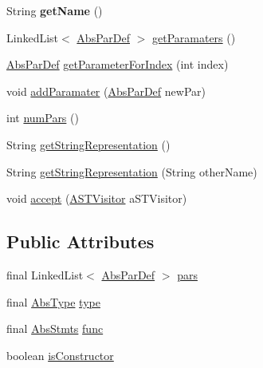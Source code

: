 \begin{DoxyCompactItemize}
String {\bfseries get\+Name} ()
\item 
Linked\+List$<$ \hyperlink{classcompiler_1_1abstr_1_1tree_1_1def_1_1_abs_par_def}{Abs\+Par\+Def} $>$ \hyperlink{classcompiler_1_1abstr_1_1tree_1_1def_1_1_abs_fun_def_adc15deedb95d9b1d1c583fb63755b910}{get\+Paramaters} ()
\item 
\hyperlink{classcompiler_1_1abstr_1_1tree_1_1def_1_1_abs_par_def}{Abs\+Par\+Def} \hyperlink{classcompiler_1_1abstr_1_1tree_1_1def_1_1_abs_fun_def_abace2842d9a93985deb64340fa29e622}{get\+Parameter\+For\+Index} (int index)
\item 
void \hyperlink{classcompiler_1_1abstr_1_1tree_1_1def_1_1_abs_fun_def_ac01d629c34d49611916d0571834c2e4e}{add\+Paramater} (\hyperlink{classcompiler_1_1abstr_1_1tree_1_1def_1_1_abs_par_def}{Abs\+Par\+Def} new\+Par)
\item 
int \hyperlink{classcompiler_1_1abstr_1_1tree_1_1def_1_1_abs_fun_def_aefa0345a1510770f1e25417c75fc0576}{num\+Pars} ()
\item 
String \hyperlink{classcompiler_1_1abstr_1_1tree_1_1def_1_1_abs_fun_def_a5554f085a80d0c03ab3279d102b3c279}{get\+String\+Representation} ()
\item 
String \hyperlink{classcompiler_1_1abstr_1_1tree_1_1def_1_1_abs_fun_def_a0a9ef5b553cacab89d24d00e010265ec}{get\+String\+Representation} (String other\+Name)
\item 
void \hyperlink{classcompiler_1_1abstr_1_1tree_1_1def_1_1_abs_fun_def_aa3fd15a24442f38f63267d1801360172}{accept} (\hyperlink{interfacecompiler_1_1abstr_1_1_a_s_t_visitor}{A\+S\+T\+Visitor} a\+S\+T\+Visitor)
\end{DoxyCompactItemize}
\subsection*{Public Attributes}
\begin{DoxyCompactItemize}
\item 
final Linked\+List$<$ \hyperlink{classcompiler_1_1abstr_1_1tree_1_1def_1_1_abs_par_def}{Abs\+Par\+Def} $>$ \hyperlink{classcompiler_1_1abstr_1_1tree_1_1def_1_1_abs_fun_def_affce067bbb05095f6f5d77a2e59a8cc0}{pars}
\item 
final \hyperlink{classcompiler_1_1abstr_1_1tree_1_1type_1_1_abs_type}{Abs\+Type} \hyperlink{classcompiler_1_1abstr_1_1tree_1_1def_1_1_abs_fun_def_ae1ea3ae300b56b151f64b298e738cf0a}{type}
\item 
final \hyperlink{classcompiler_1_1abstr_1_1tree_1_1_abs_stmts}{Abs\+Stmts} \hyperlink{classcompiler_1_1abstr_1_1tree_1_1def_1_1_abs_fun_def_aeabcdff830e9ea48a6cd194d456559a2}{func}
\item 
boolean \hyperlink{classcompiler_1_1abstr_1_1tree_1_1def_1_1_abs_fun_def_a5767197865d3647137e0b1b6b42e3d4d}{is\+Constructor}
\end{DoxyCompactItemize}
